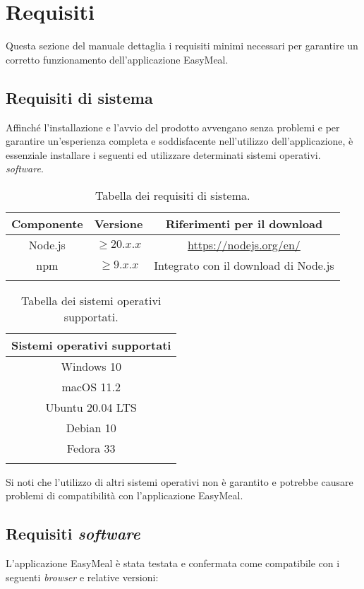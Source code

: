 \section{Requisiti}
Questa sezione del manuale dettaglia i requisiti minimi necessari per garantire un corretto funzionamento dell'applicazione EasyMeal.

\subsection{Requisiti di sistema}
Affinché l'installazione e l'avvio del prodotto avvengano senza problemi e per garantire un'esperienza completa e soddisfacente nell'utilizzo 
dell'applicazione, è essenziale installare i seguenti ed utilizzare determinati sistemi operativi. \textit{software}.

\begin{longtable}{|c|c|c|}
	\hline
	\textbf{Componente} & \textbf{Versione} & \textbf{Riferimenti per il download} \\
	\hline
	Node.js & $ \geq  20.x.x$ & \href{https://nodejs.org/en/}{https://nodejs.org/en/} \\
	\hline
	npm & $ \geq 9.x.x$ & Integrato con il download di Node.js \\
	\hline
	\caption{Tabella dei requisiti di sistema.}
\end{longtable}



\begin{longtable}{|c|}
	\hline
	\textbf{Sistemi operativi supportati} \\
	\hline
	Windows 10 \\
	macOS 11.2 \\
	Ubuntu 20.04 LTS \\
    Debian 10 \\
    Fedora 33 \\
	\hline
	\caption{Tabella dei sistemi operativi supportati.}
\end{longtable}



Si noti che l'utilizzo di altri sistemi operativi non è garantito e potrebbe causare problemi di compatibilità con l'applicazione EasyMeal.


\subsection{Requisiti \textit{software}}
L'applicazione EasyMeal è stata testata e confermata come compatibile con i seguenti \textit{browser} e relative versioni: 

